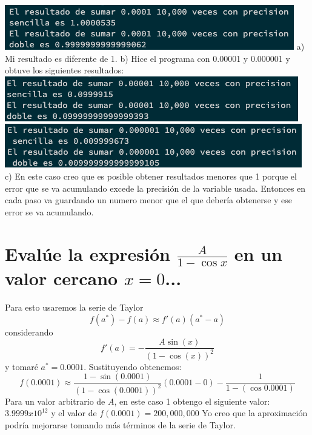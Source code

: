 \documentclass{article}
\begin{document}
\includegraphics[scale=0.75]{resultadoSumaTarea2.png}
\linebreak 
a) Mi resultado es diferente de 1.
\linebreak 
b) Hice el programa con 0.00001 y 0.000001 y obtuve los siguientes resultados:
\linebreak 
\includegraphics[scale=0.75]{SumaPequenos.png}
\linebreak 
\includegraphics[scale=0.75]{SumaPequenos2.png}
\linebreak 
c) En este caso creo que es posible obtener resultados menores que 1 porque el error que se va acumulando excede la precisión de la variable usada. 
Entonces en cada paso va guardando un numero menor que el que debería obtenerse y ese error se va acumulando.

\section{Evalúe la expresión $\frac{A}{1-\cos x}$ en un valor cercano $x=0$...}
Para esto usaremos la serie de Taylor
\begin{equation}
    f(a^*)-f(a)\approx f'(a)(a^*-a)
\end{equation}
considerando
\begin{equation}
    f'(a)=-\frac{A\sin(x)}{(1-\cos(x))^2}
\end{equation}
y tomaré $a^* = 0.0001$. Sustituyendo obtenemos:
\begin{equation}
    f(0.0001)\approx \frac{1-\sin(0.0001)}{(1-\cos(0.0001))^2}(0.0001-0) - \frac{1}{1-(\cos 0.0001)}
\end{equation}
Para un valor arbitrario de $A$, en este caso 1 obtengo el siguiente valor: $3.9999x10^{12}$ y el valor de $f(0.0001) = 200,000,000$
Yo creo que la aproximación podría mejorarse tomando más términos de la serie de Taylor.
\end{document}
